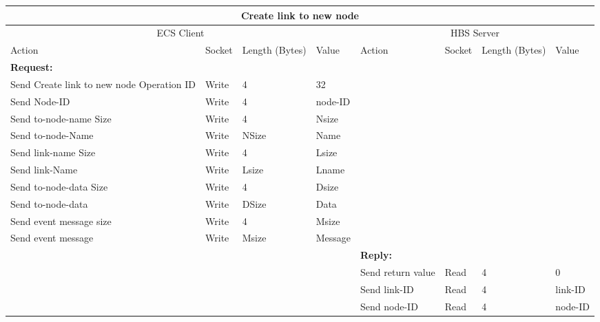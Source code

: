 \bigskip
\small
\begin{tabular}{|p{1.2in}|p{.4in}|p{.4in}|p{.5in}|p{1.2in}|p{.4in}|p{.4in}|p{.5in} |} \hline
\multicolumn{8}{|c|}{{\bf Create link to new node}} \\ \hline
\multicolumn{4}{|c|}{ECS Client} & \multicolumn{4}{|c|}{HBS Server} \\ \hline
Action            & Socket & Length  
                            (Bytes)& Value & Action       & Socket & Length 
                                                                    (Bytes)& Value \\ \hline
\multicolumn{4}{|l}{{\bf Request:}}&\multicolumn{4}{|l|}{~} \\ \hline
Send Create link to new node  Operation ID  & Write  & 4     & 32     &              &        &       &       \\ \hline
Send Node-ID      & Write  & 4     &  node-ID &           &        &       &       \\ \hline
Send to-node-name Size    & Write  & 4     &  Nsize &        &        &       &       \\ \hline
Send to-node-Name         & Write  &  NSize &  Name &   &        &       &       \\ \hline
Send link-name Size    & Write  & 4     &  Lsize &        &        &       &       \\ \hline
Send link-Name         & Write  &  Lsize &  Lname &   &        &       &       \\ \hline
Send to-node-data Size    & Write  & 4     &  Dsize &        &        &       &       \\ \hline
Send to-node-data         & Write  &  DSize &  Data &   &        &       &       \\ \hline
Send event
message size      & Write  & 4     &  Msize &         &        &       &       \\ \hline
Send event message
                  & Write  &  Msize  &  Message &     &        &       &       \\ \hline
\multicolumn{4}{|l}{~}&\multicolumn{4}{|l|}{{\bf Reply:}} \\ \hline
                  &        &       &       & Send return
                                             value        & Read   &  4    & 0       \\ \hline
                  &        &       &       & Send link-ID & Read &  4    &  link-ID \\ \hline
                  &        &       &       & Send node-ID    & Read   & 4 &  node-ID \\ \hline

\end{tabular}
